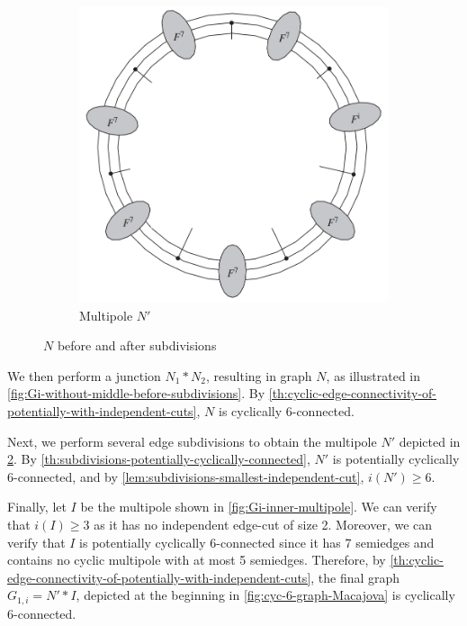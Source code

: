 \documentclass[12pt, twoside]{book}
\begin{document}
\begin{example}
\begin{figure}
\begin{subfigure}[b]{0.45\textwidth}
			\includegraphics[width=\textwidth]{images/multipole-to-Gi-without-middle}
			\caption{Multipole $N'$}
			\label{fig:Gi-without-middle-after-subdivisions}
		\end{subfigure}
		\caption{$N$ before and after subdivisions}
	\end{figure}

	We then perform a junction $N_1*N_2$, resulting in graph $N$, as illustrated in \cref{fig:Gi-without-middle-before-subdivisions}. By \cref{th:cyclic-edge-connectivity-of-potentially-with-independent-cuts}, $N$ is cyclically 6-connected.
	
	Next, we perform several edge subdivisions to obtain the multipole $N'$ depicted in \cref{fig:Gi-without-middle-after-subdivisions}. By \cref{th:subdivisions-potentially-cyclically-connected}, $N'$ is potentially cyclically 6-connected, and by \cref{lem:subdivisions-smallest-independent-cut}, $i(N')\geq 6$.
	
	Finally, let $I$ be the multipole shown in \cref{fig:Gi-inner-multipole}. We can verify that $i(I)\geq 3$ as it has no independent edge-cut of size 2. Moreover, we can verify that $I$ is potentially cyclically 6-connected since it has 7 semiedges and contains no cyclic multipole with at most 5 semiedges. Therefore, by \cref{th:cyclic-edge-connectivity-of-potentially-with-independent-cuts}, the final graph $G_{1,i}=N'*I$, depicted at the beginning in \cref{fig:cyc-6-graph-Macajova} is cyclically 6-connected.
\end{example}
\end{document}

